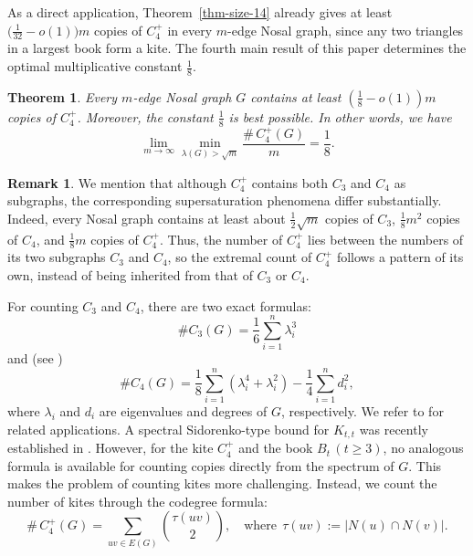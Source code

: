 \documentclass[11pt,a4paper]{article}
\newtheorem{theorem}{Theorem}[section]
\theoremstyle{definition}
\newtheorem{remark}{Remark}
\theoremstyle{plain}
\renewcommand{\ge}{\geqslant}
\begin{document}
\smallskip 

As a direct application, Theorem~\ref{thm-size-14} already gives at least
$\big(\frac{1}{32}-o(1) \big)m$ copies of $C_4^+$ in every $m$-edge Nosal graph, since any two triangles in a largest
book form a kite. 
The fourth main result of this paper determines the 
optimal multiplicative constant $\tfrac18$.  

\begin{theorem} \label{thm-C4+}
Every $m$-edge Nosal graph $G$ contains at least 
$\left( \frac{1}{8} - o(1)\right) m$ copies of $C_4^+$. Moreover, the constant $\frac{1}{8}$ is best possible. In other words, we have 
\[  \lim\limits_{m \to \infty} \min_{\lambda (G)> \sqrt{m}} \frac{\texttt{\#}\,C_4^+(G)}{m} = \frac{1}{8}.  \]
\end{theorem}

\begin{remark}
We mention that although $C_4^+$ contains both $C_3$ and $C_4$ as subgraphs, 
the corresponding supersaturation phenomena differ substantially. 
Indeed, every Nosal graph contains at least about $\frac{1}{2}\sqrt{m}$ copies of $C_3$, 
$\frac{1}{8} m^2$ copies of $C_4$, and $\frac{1}{8}m$ copies of $C_4^+$. 
Thus, the number of $C_4^+$ lies between the numbers of its two subgraphs $C_3$ and $C_4$, so the extremal count of $C_4^+$ follows a pattern of its own, instead of being inherited  from that of $C_3$ or $C_4$. 
\end{remark}

\smallskip
For counting $C_3$ and $C_4$, there are two exact formulas: 
$$\texttt{\#}C_3(G)=\frac{1}{6} \sum_{i=1}^n \lambda_i^3$$ 
and (see \cite{LL2009DM}) 
$$\texttt{\#}C_4(G) = \frac{1}{8} \sum_{i=1}^n (\lambda_i^4 + \lambda_i^2) - \frac{1}{4} \sum_{i=1}^n d_i^2,$$
 where $\lambda_i$ and $d_i$ are eigenvalues and degrees of $G$, respectively. We refer to \cite{LNW2021, NingZhai2023, NZ2021b,LiLiuZhang26} for related  applications. 
A spectral Sidorenko-type bound for $K_{t,t}$ was recently established in \cite{LLLZ2026}. 
However, for the kite $C_4^+$ and the book $B_t\, (t\ge 3)$, no analogous formula is available for counting copies directly from the spectrum of $G$. 
This makes the problem of counting kites more challenging. 
Instead, we count the number of kites through the codegree formula: 
$$\texttt{\#}\,C_4^+(G)=\sum_{uv\in E(G)}\binom{\tau(uv)}{2}, \quad \text{where}~~\tau(uv):=|N(u)\cap N(v)|. $$ 
\end{document}
